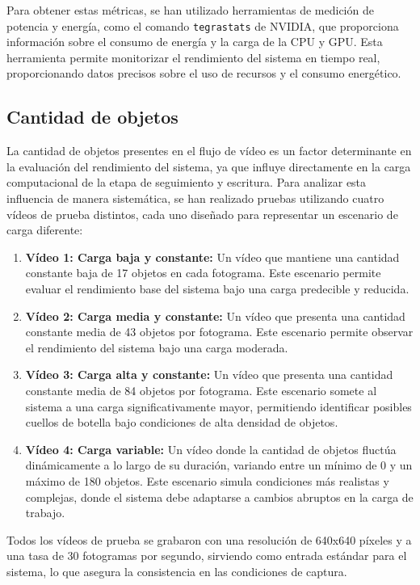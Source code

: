 \documentclass[11pt,spanish,listoffigures,listoftables]{tfgetsinf}
\begin{document}
Para obtener estas métricas, se han utilizado herramientas de medición de potencia y energía, como el comando \texttt{tegrastats}\cite{nvidia_tegrastats} de NVIDIA, que proporciona información sobre el consumo de energía y la carga de la CPU y GPU. Esta herramienta permite monitorizar el rendimiento del sistema en tiempo real, proporcionando datos precisos sobre el uso de recursos y el consumo energético.

\subsection{Cantidad de objetos} \label{sec:cantidad_objetos}
La cantidad de objetos presentes en el flujo de vídeo es un factor determinante en la evaluación del rendimiento del sistema, ya que influye directamente en la carga computacional de la etapa de seguimiento y escritura. Para analizar esta influencia de manera sistemática, se han realizado pruebas utilizando cuatro vídeos de prueba distintos, cada uno diseñado para representar un escenario de carga diferente:
\begin{enumerate}


   \item \textbf{Vídeo 1: Carga baja y constante:} Un vídeo que mantiene una cantidad constante baja de 17 objetos en cada fotograma. Este escenario permite evaluar el rendimiento base del sistema bajo una carga predecible y reducida.
   \item \textbf{Vídeo 2: Carga media y constante:} Un vídeo que presenta una cantidad constante media de 43 objetos por fotograma. Este escenario permite observar el rendimiento del sistema bajo una carga moderada.
   \item \textbf{Vídeo 3: Carga alta y constante:} Un vídeo que presenta una cantidad constante media de 84 objetos por fotograma. Este escenario somete al sistema a una carga significativamente mayor, permitiendo identificar posibles cuellos de botella bajo condiciones de alta densidad de objetos.
   \item \textbf{Vídeo 4: Carga variable:} Un vídeo donde la cantidad de objetos fluctúa dinámicamente a lo largo de su duración, variando entre un mínimo de 0 y un máximo de 180 objetos. Este escenario simula condiciones más realistas y complejas, donde el sistema debe adaptarse a cambios abruptos en la carga de trabajo.
\end{enumerate}
Todos los vídeos de prueba se grabaron con una resolución de 640x640 píxeles y a una tasa de 30 fotogramas por segundo, sirviendo como entrada estándar para el sistema, lo que asegura la consistencia en las condiciones de captura.
\end{document}
